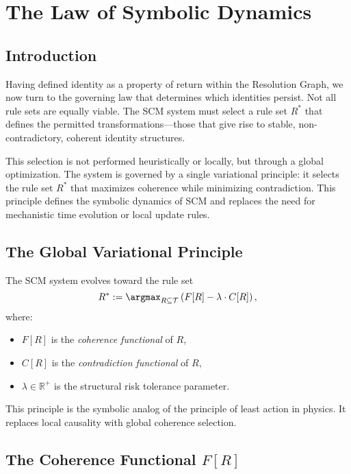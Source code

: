 \chapter{The Law of Symbolic Dynamics}

\section*{Introduction}

Having defined identity as a property of return within the Resolution Graph, we now turn to the governing law that determines which identities persist. Not all rule sets are equally viable. The SCM system must select a rule set $R^*$ that defines the permitted transformations—those that give rise to stable, non-contradictory, coherent identity structures.

This selection is not performed heuristically or locally, but through a global optimization. The system is governed by a single variational principle: it selects the rule set $R^*$ that maximizes coherence while minimizing contradiction. This principle defines the symbolic dynamics of SCM and replaces the need for mechanistic time evolution or local update rules.

\section{The Global Variational Principle}

\begin{axiom}
The SCM system evolves toward the rule set
\begin{equation}
R^* := \argmax_{R \subseteq \mathcal{T}} \left( F[R] - \lambda \cdot C[R] \right),
\end{equation}
where:
\begin{itemize}
    \item $F[R]$ is the \emph{coherence functional} of $R$,
    \item $C[R]$ is the \emph{contradiction functional} of $R$,
    \item $\lambda \in \mathbb{R}^+$ is the structural risk tolerance parameter.
\end{itemize}
\end{axiom}

\noindent
This principle is the symbolic analog of the principle of least action in physics. It replaces local causality with global coherence selection.

\section{The Coherence Functional $F[R]$}

